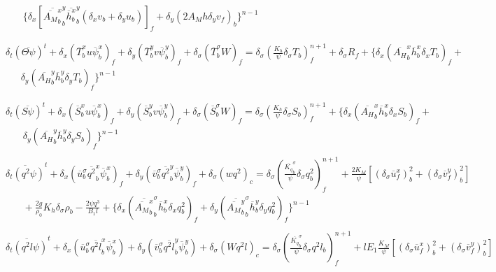 \documentclass[oribibl]{llncs}
\begin{document}
\begin{eqnarray}
&&\ \ \ \ \ \ \ \  \{\delta_x [ \overline{ \overline {A_M}^x_b }^y_b \overline {\overline{h}^x_b }^y_b (\delta_x v_b + \delta_y u_b)]_f + \delta_y (2A_Mh\delta_y v_f)_b \}^{n-1}  \label{eq:fde3}\\
\nonumber \\ 
\nonumber \\
&&\delta_t(\overline{\Theta \psi})^t + \delta_x (\overline{T}^x_b u \overline{\psi}^x_b)_f + \delta_y (\overline{T}^y_b v \overline{\psi}^y_b)_f + \delta_\sigma (\overline{T}_b^\sigma  W)_f =  \delta_\sigma ( \frac{K_h}{\psi} \delta_{\sigma} T_b )_f^{n+1}  + \delta_\sigma R_f +  \{\delta_x (\overline{A_H}^x_b \overline{ h}^x_b\delta_x T_b)_f  +  \nonumber \\
&&\ \ \ \ \ \ \ \delta_y (\overline{A_H}^y_b \overline{h}^y_b \delta_y T_b)_f \}^{n-1} \label{eq:fde4}\\
\nonumber \\ 
\nonumber \\
&&\delta_t(\overline{S \psi})^t + \delta_x (\overline{S}^x_b u \overline{\psi}^x_b)_f + \delta_y (\overline{S}^y_b v \overline{\psi}^y_b)_f + \delta_\sigma (\overline{S}_b^\sigma W)_f =  \delta_\sigma ( \frac{K_h}{\psi} \delta_{\sigma} S_b )_f^{n+1} + \{\delta_x (\overline{A_H}^x_b \overline{h}^x_b \delta_x S_b)_f + \nonumber \\
&&\ \ \ \ \ \ \ \  \delta_y (\overline{A_H}^y_b \overline{h}^y_b\delta_y S_b)_f \}^{n-1}  \label{eq:fde5}\\
\nonumber \\
&&\overline{\delta_t (q^2 \psi)}^t + \delta_x (\overline{u}^\sigma_b \overline{q^2}^x_b \overline{\psi}^x_b)_f + \delta_y (\overline{v}^\sigma_b \overline{q^2}^y_b \overline{\psi}^y_b)_f +  \delta_\sigma (w q^2)_c  =  \delta_\sigma ( \frac{\overline {K_q}^\sigma_b}{\psi} \delta_\sigma q^2_b)^{n+1}_f +\frac{2K_M}{\psi} \left[ (\delta_\sigma \overline{u}^x_f)^2_b + (\delta_\sigma \overline{v}^y_f)^2_b  \right] \nonumber \\ 
&&\ \ \ \ \ \ \ \  + \frac{2g}{\rho_0} K_h \delta_\sigma \rho_b - \frac{2\psi q^3}{B_1 l} + \{ \delta_x ( \overline{ \overline {A_M}^x_b }^\sigma_b {\overline{h}^x_b } \delta_x q^2_b)_f + \delta_y ( \overline{ \overline {A_M}^y_b }^\sigma_b {\overline{h}^y_b } \delta_y q^2_b)_f \}^{n-1} \label{eq:fde6} \\
\nonumber \\
&&\overline{\delta_t (q^2 l \psi)}^t + \delta_x (\overline{u}^\sigma_b \overline{q^2 l}^x_b \overline{\psi}^x_b) + \delta_y (\overline{v}^\sigma_b \overline{q^2 l}^y_b \overline{\psi}^y_b) +  \delta_\sigma (Wq^2 l)_c  =  \delta_\sigma ( \frac{\overline {K_q}^\sigma_b}{\psi} \delta_\sigma q^2 l_b)^{n+1}_f +l E_1 \frac{K_M}{\psi} \left[ (\delta_\sigma \overline{u}^x_f)^2_b + (\delta_\sigma \overline{v}^y_f)^2_b  \right] \nonumber \\ 

\end{eqnarray}
\end{document}
